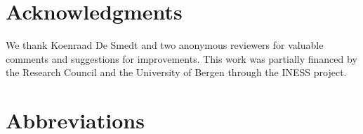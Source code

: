 \documentclass[output=paper]{langsci/langscibook}
\begin{document}


\section*{Acknowledgments}
We thank Koenraad De Smedt and two anonymous reviewers for valuable comments and suggestions for improvements.
This work was partially financed by the  Research Council and the University of Bergen through the INESS project.

\section*{Abbreviations}
\end{document}
